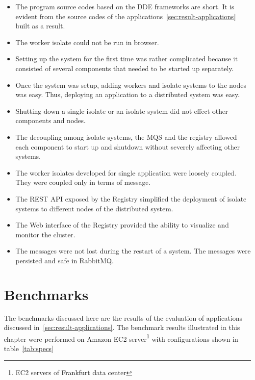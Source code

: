 \begin{itemize}
  \item The program source codes based on the DDE frameworks are short. It is evident from the source codes of the applications~\autoref{sec:result-applications} built as a result.

  \item The worker isolate could not be run in browser.

  \item Setting up the system for the first time was rather complicated because it consisted of several components that needed to be started up separately.

  \item Once the system was setup, adding workers and isolate systems to the nodes was easy. Thus, deploying an application to a distributed system was easy.

  \item Shutting down a single isolate or an isolate system did not effect other components and nodes.

  \item The decoupling among isolate systems, the MQS and the registry allowed each component to start up and shutdown without severely affecting other systems.

  \item The worker isolates developed for single application were loosely coupled. They were coupled only in terms of message.

  \item The REST API exposed by the Registry simplified the deployment of isolate systems to different nodes of the distributed system.

  \item The Web interface of the Registry provided the ability to visualize and monitor the cluster.

  \item The messages were not lost during the restart of a system. The messages were persisted and safe in RabbitMQ.
\end{itemize}

\section{Benchmarks}
\label{sec:benchmarks}
  The benchmarks discussed here are the results of the evaluation of applications discussed in~\autoref{sec:result-applications}. The benchmark results illustrated in this chapter were performed on Amazon EC2 server\footnote{EC2 servers of Frankfurt data center} with configurations shown in table~\autoref{tab:specs}

